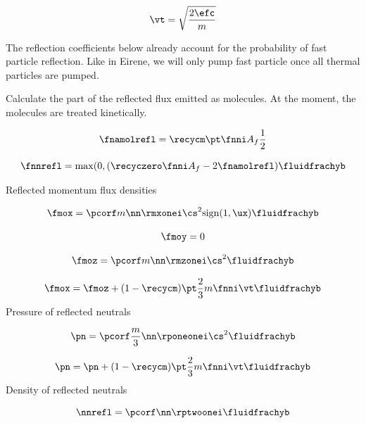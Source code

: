 \begin{equation}
    \vt = \sqrt{\frac{2 \efc}{m}}
\end{equation}

The reflection coefficients below already account for the probability of fast particle reflection. Like in Eirene, we will only pump fast particle once all thermal particles are pumped.

Calculate the part of the reflected flux emitted as molecules. At the moment, the molecules are treated kinetically.

\begin{equation}
    \fnamolrefl = \recycm \pt \fnni A_f \frac{1}{2}
\end{equation}

\begin{equation}
    \fnnrefl = \mathrm{max}(0,(\recyczero \fnni A_f - 2 \fnamolrefl ) \fluidfrachyb
\end{equation}

Reflected momentum flux densities

\begin{equation}
    \fmox = \pcorf m \nn \rmxonei \cs^2 \mathrm{sign}(1,\ux) \fluidfrachyb
\end{equation}

\begin{equation}
    \fmoy = 0
\end{equation}

\begin{equation}
    \fmoz = \pcorf m \nn \rmzonei \cs^2 \fluidfrachyb
\end{equation}

\begin{equation}
    \fmox = \fmoz + (1-\recycm) \pt \frac{2}{3} m \fnni \vt \fluidfrachyb
\end{equation}
Pressure of reflected neutrals

\begin{equation}
    \pn = \pcorf \frac{m}{3} \nn \rponeonei \cs^2 \fluidfrachyb
\end{equation}

\begin{equation}
    \pn = \pn + (1-\recycm) \pt \frac{2}{3} m \fnni \vt \fluidfrachyb
\end{equation}
Density of reflected neutrals

\begin{equation}
    \nnrefl = \pcorf \nn \rptwoonei \fluidfrachyb
\end{equation}


